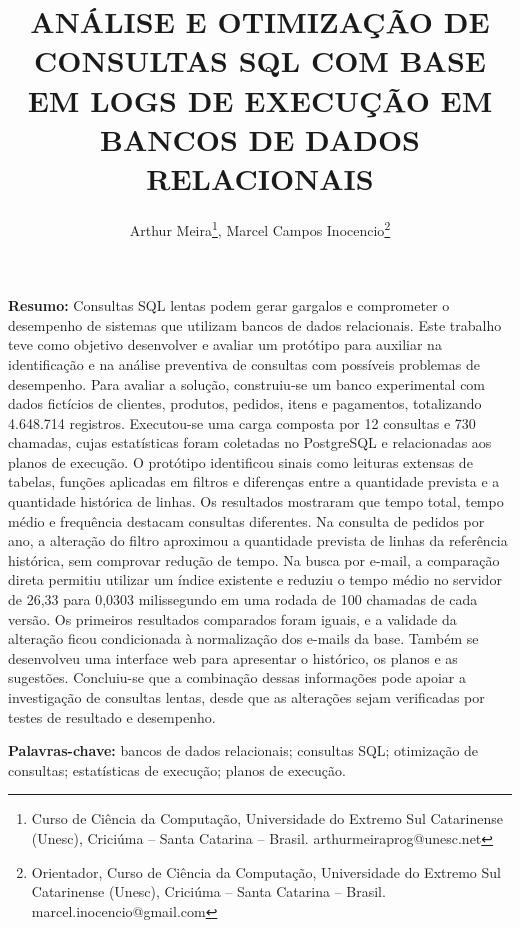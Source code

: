 \documentclass{UNESC}
\title{ANÁLISE E OTIMIZAÇÃO DE CONSULTAS SQL COM BASE EM LOGS DE EXECUÇÃO EM BANCOS DE DADOS RELACIONAIS}
\author{
Arthur Meira\footnote{
Curso de Ciência da Computação, Universidade do Extremo Sul Catarinense
(Unesc), Criciúma -- Santa Catarina -- Brasil.
arthurmeiraprog@unesc.net
},
Marcel Campos Inocencio\footnote{
Orientador, Curso de Ciência da Computação, Universidade do Extremo Sul
Catarinense (Unesc), Criciúma -- Santa Catarina -- Brasil.
marcel.inocencio@gmail.com
}
}
\begin{document}
\onehalfspacing
\maketitle


\noindent
\textbf{Resumo:}
Consultas SQL lentas podem gerar gargalos e comprometer o desempenho de sistemas que utilizam bancos de dados relacionais. Este trabalho teve como objetivo desenvolver e avaliar um protótipo para auxiliar na identificação e na análise preventiva de consultas com possíveis problemas de desempenho. Para avaliar a solução, construiu-se um banco experimental com dados fictícios de clientes, produtos, pedidos, itens e pagamentos, totalizando 4.648.714 registros. Executou-se uma carga composta por 12 consultas e 730 chamadas, cujas estatísticas foram coletadas no PostgreSQL e relacionadas aos planos de execução. O protótipo identificou sinais como leituras extensas de tabelas, funções aplicadas em filtros e diferenças entre a quantidade prevista e a quantidade histórica de linhas. Os resultados mostraram que tempo total, tempo médio e frequência destacam consultas diferentes. Na consulta de pedidos por ano, a alteração do filtro aproximou a quantidade prevista de linhas da referência histórica, sem comprovar redução de tempo. Na busca por e-mail, a comparação direta permitiu utilizar um índice existente e reduziu o tempo médio no servidor de 26,33 para 0,0303 milissegundo em uma rodada de 100 chamadas de cada versão. Os primeiros resultados comparados foram iguais, e a validade da alteração ficou condicionada à normalização dos e-mails da base. Também se desenvolveu uma interface web para apresentar o histórico, os planos e as sugestões. Concluiu-se que a combinação dessas informações pode apoiar a investigação de consultas lentas, desde que as alterações sejam verificadas por testes de resultado e desempenho.

\vspace{0.5em}
\noindent
\textbf{Palavras-chave:}
bancos de dados relacionais; consultas SQL; otimização de consultas;
estatísticas de execução; planos de execução.
\end{document}
